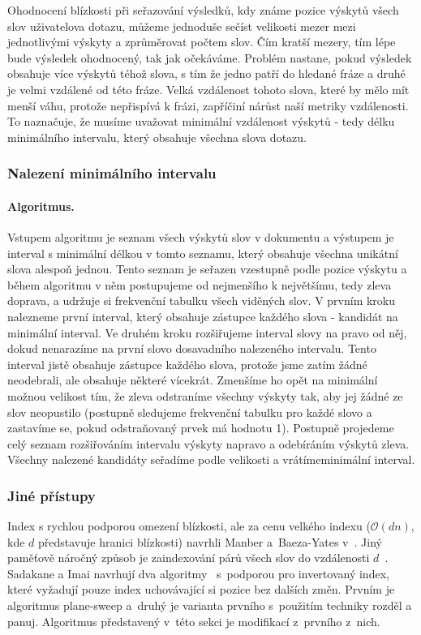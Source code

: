 \documentclass[11pt,letterpaper,oneside,openright]{book}
\begin{document}
Ohodnocení blízkosti při seřazování výsledků, kdy známe pozice výskytů všech
slov uživatelova dotazu, můžeme jednoduše sečíst velikosti mezer mezi
jednotlivými výskyty a zprůměrovat počtem slov. Čím kratší mezery, tím lépe
bude výsledek ohodnocený, tak jak očekáváme. Problém nastane, pokud výsledek
obsahuje více výskytů téhož slova, s tím že jedno patří do hledané fráze a
druhé je velmi vzdálené od této fráze. Velká vzdálenost tohoto slova, které by
mělo mít menší váhu, protože nepřispívá k frázi, zapříčiní nárůst naší metriky
vzdálenosti. To naznačuje, že musíme uvažovat minimální vzdálenost výskytů -
tedy délku minimálního intervalu, který obsahuje všechna slova dotazu.

\subsubsection{Nalezení minimálního intervalu} \label{sec:find_minimal_interval}
\paragraph{Algoritmus.} Vstupem algoritmu je seznam všech výskytů slov v
dokumentu a výstupem je interval s minimální délkou v tomto seznamu, který
obsahuje všechna unikátní slova alespoň jednou. Tento seznam je seřazen
vzestupně podle pozice výskytu a během algoritmu v něm postupujeme od
nejmenšího k největšímu, tedy zleva doprava, a udržuje si frekvenční tabulku
všech viděných slov.  V prvním kroku nalezneme první interval, který obsahuje
zástupce každého slova - kandidát na minimální interval. Ve druhém kroku
rozšiřujeme interval slovy na pravo od něj, dokud nenarazíme na první slovo
dosavadního nalezeného intervalu. Tento interval jistě obsahuje zástupce
každého slova, protože jsme zatím žádné neodebrali, ale obsahuje některé
vícekrát. Zmenšíme ho opět na minimální možnou velikost tím, že zleva
odstraníme všechny výskyty tak, aby jej žádné ze slov neopustilo (postupně
sledujeme frekvenční tabulku pro každé slovo a zastavíme se, pokud odstraňovaný
prvek má hodnotu 1). Postupně projedeme celý seznam rozšiřováním intervalu
výskyty napravo a odebíráním výskytů zleva. Všechny nalezené kandidáty seřadíme
podle velikosti a vrátímeminimální interval.

\subsubsection{Jiné přístupy}
Index s rychlou podporou omezení blízkosti, ale za cenu velkého indexu
($\mathcal{O}(dn)$, kde $d$ představuje hranici blízkosti) navrhli Manber
a~Baeza-Yates v~\cite{MANBER1991133}. Jiný paměťově náročný způsob je
zaindexování párů všech slov do vzdálenosti $d$~\cite{Aref95}. Sadakane a Imai
navrhují dva algoritmy~\cite{Sadakane99textretrieval} s~podporou pro
invertovaný index, které vyžadují pouze index uchovávající si pozice bez
dalších změn. Prvním je algoritmus plane-sweep a~druhý je varianta prvního
s~použitím techniky rozděl a panuj. Algoritmus představený v~této sekci je
modifikací z~prvního z~nich.
\end{document}
